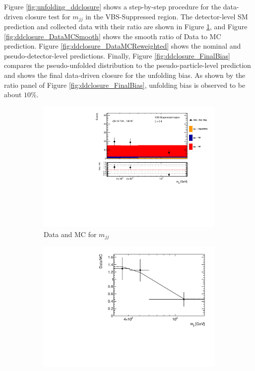 Figure \ref{fig:unfolding_ddclosure} shows a step-by-step procedure for the data-driven closure test for $m_{jj}$ in the VBS-Suppressed region. The detector-level SM prediction and collected data with their ratio are shown in Figure \ref{fig:ddclosure_DataMC}, and Figure \ref{fig:ddclosure_DataMCSmooth} shows the smooth ratio of Data to MC prediction. Figure \ref{fig:ddclosure_DataMCReweighted} shows the nominal and pseudo-detector-level predictions. Finally, Figure \ref{fig:ddclosure_FinalBias} compares the pseudo-unfolded distribution to the pseudo-particle-level prediction and shows the final data-driven closure for the unfolding bias. As shown by the ratio panel of Figure \ref{fig:ddclosure_FinalBias}, unfolding bias is observed to be about $10\%$. 
\begin{figure}[htb]
    \centering
    \begin{subfigure}{.48\textwidth}
        \centering
        \includegraphics[width=.9\linewidth]{figures/Analysis/Unfolding/DDClosure_VBS_Suppressed_Ratio.pdf}
        \caption{ Data and MC for $m_{jj}$ \label{fig:ddclosure_DataMC}}
    \end{subfigure}
    \begin{subfigure}{.48\textwidth}
        \centering
        \includegraphics[width=.9\linewidth]{figures/Analysis/Unfolding/DDClosure_VBS_Suppressed_SmoothRatio.pdf}

\end{subfigure}
\end{figure}
